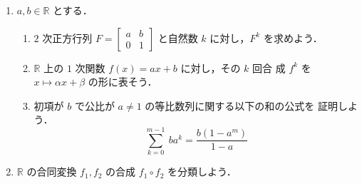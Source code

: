 \documentclass[11pt, uplatex, dvipdfmx, titlepage]{jsarticle}
\theoremstyle{definition}
\begin{document}
\begin{enumerate}


\item $a, b \in \mathbb{R}$ とする．
  \begin{enumerate}[(1)]

  \item $2$ 次正方行列 $F=\left[
      \begin{array}{cc}
        a & b\\
        0 & 1
      \end{array}
    \right]$ と自然数 $k$ に対し，$F^k$ を求めよう．

  \item $\mathbb{R}$ 上の $1$ 次関数 $f(x) = ax+b$ に対し，その $k$ 回合
  成 $f^k$ を $x \mapsto \alpha x + \beta$ の形に表そう．

\item 初項が $b$ で公比が $a \neq 1$ の等比数列に関する以下の和の公式を
  証明しよう．
  \[
    \sum_{k=0}^{m-1} \ b a^{k} = \frac{b \left( 1-a^m\right)}{1-a}
  \]
  \end{enumerate}

\item $\mathbb{R}$ の合同変換 $f_1, f_2$ の合成 $f_1
  \circ f_2$ を分類しよう．

\end{enumerate}
\end{document}
